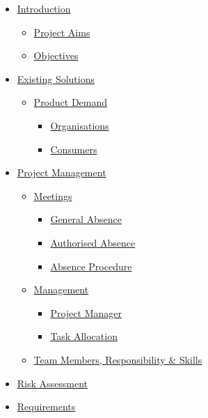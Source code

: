 \documentclass[
  english,
  a4paper,
,tablecaptionabove
]{scrartcl}
\providecommand{\tightlist}{%
  \setlength{\itemsep}{0pt}\setlength{\parskip}{0pt}}
\begin{document}
\begin{itemize}
\tightlist
\item
  \protect\hyperlink{introduction}{Introduction}

  \begin{itemize}
  \tightlist
  \item
    \protect\hyperlink{project-aims}{Project Aims}
  \item
    \protect\hyperlink{objectives}{Objectives}
  \end{itemize}
\item
  \protect\hyperlink{existing-solutions}{Existing Solutions}

  \begin{itemize}
  \tightlist
  \item
    \protect\hyperlink{product-demand}{Product Demand}

    \begin{itemize}
    \tightlist
    \item
      \protect\hyperlink{organisations}{Organisations}
    \item
      \protect\hyperlink{consumers}{Consumers}
    \end{itemize}
  \end{itemize}
\item
  \protect\hyperlink{project-management}{Project Management}

  \begin{itemize}
  \tightlist
  \item
    \protect\hyperlink{meetings}{Meetings}

    \begin{itemize}
    \tightlist
    \item
      \protect\hyperlink{general-absence}{General Absence}
    \item
      \protect\hyperlink{authorised-absence}{Authorised Absence}
    \item
      \protect\hyperlink{absence-procedure}{Absence Procedure}
    \end{itemize}
  \item
    \protect\hyperlink{management}{Management}

    \begin{itemize}
    \tightlist
    \item
      \protect\hyperlink{project-manager}{Project Manager}
    \item
      \protect\hyperlink{task-allocation}{Task Allocation}
    \end{itemize}
  \item
    \protect\hyperlink{team-members-responsibility--skills}{Team
    Members, Responsibility \& Skills}
  \end{itemize}
\item
  \protect\hyperlink{risk-assessment}{Risk Assessment}
\item
  \protect\hyperlink{requirements}{Requirements}


\end{itemize}
\end{document}
